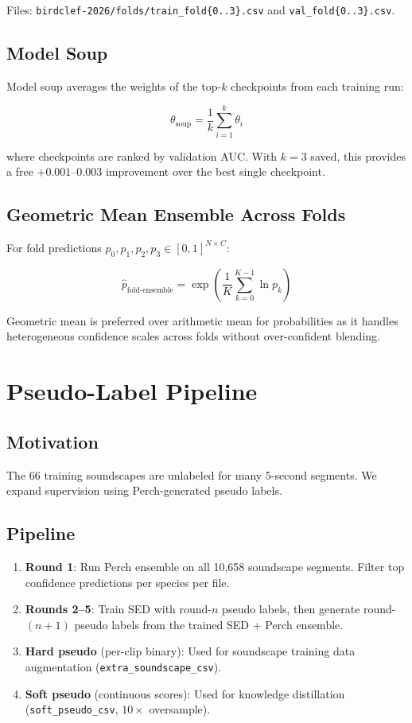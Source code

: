 \documentclass[11pt,a4paper]{article}
\begin{document}
\noindent Files: \texttt{birdclef-2026/folds/train\_fold\{0..3\}.csv} and
\texttt{val\_fold\{0..3\}.csv}.

\subsection{Model Soup}

Model soup \cite{wortsman2022model} averages the weights of the top-$k$ checkpoints
from each training run:

\[
\theta_{\text{soup}} = \frac{1}{k} \sum_{i=1}^{k} \theta_i
\]

where checkpoints are ranked by validation AUC. With $k=3$ saved, this provides a
free $+0.001$--$0.003$ improvement over the best single checkpoint.

\subsection{Geometric Mean Ensemble Across Folds}

For fold predictions $p_0, p_1, p_2, p_3 \in [0,1]^{N \times C}$:

\[
\hat{p}_{\text{fold-ensemble}} = \exp\!\left(\frac{1}{K}\sum_{k=0}^{K-1}\ln p_k\right)
\]

Geometric mean is preferred over arithmetic mean for probabilities as it handles
heterogeneous confidence scales across folds without over-confident blending.

\section{Pseudo-Label Pipeline}
\label{sec:pseudo}

\subsection{Motivation}

The 66 training soundscapes are unlabeled for many 5-second segments. We expand
supervision using Perch-generated pseudo labels.

\subsection{Pipeline}

\begin{enumerate}[leftmargin=1.5em]
\item \textbf{Round 1}: Run Perch ensemble on all 10{,}658 soundscape segments.
  Filter top confidence predictions per species per file.
\item \textbf{Rounds 2--5}: Train SED with round-$n$ pseudo labels, then generate
  round-$(n+1)$ pseudo labels from the trained SED + Perch ensemble.
\item \textbf{Hard pseudo} (per-clip binary): Used for soundscape training data augmentation
  (\texttt{extra\_soundscape\_csv}).
\item \textbf{Soft pseudo} (continuous scores): Used for knowledge distillation
  (\texttt{soft\_pseudo\_csv}, $10\times$ oversample).
\end{enumerate}
\end{document}
